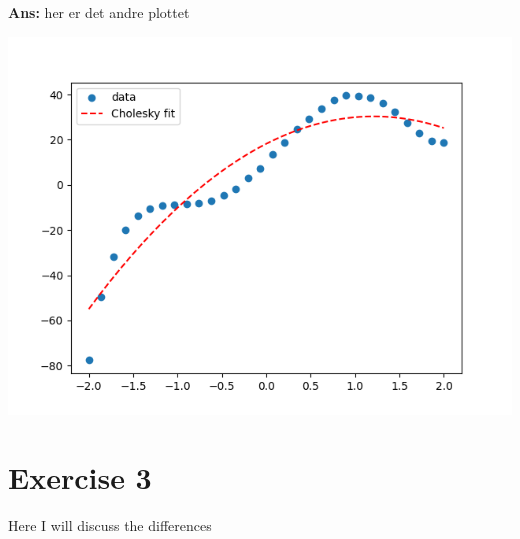 \documentclass[11pt]{article}
\newenvironment{solbox}
  {\begin{mdframed}[linewidth=1pt,linecolor=black,roundcorner=5pt]
   \noindent\textbf{Ans: }\enspace}
  {\end{mdframed}}
\begin{document}
\begin{solbox}
    her er det andre plottet
    \begin{center}
    \includegraphics[width=0.75\linewidth]{../Figures/M3Chol_plot_dataset2.png}
    \end{center}


    

\end{solbox}


\section{Exercise 3}

Here I will discuss the differences
\end{document}
